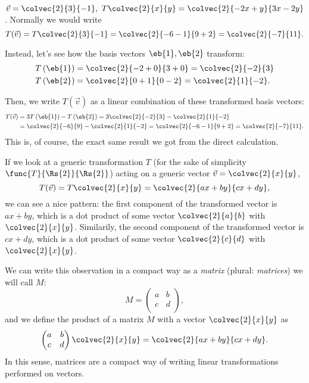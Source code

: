 \begin{example}
  $\vec{v}=\colvec{2}{3}{-1},\ T\colvec{2}{x}{y} = \colvec{2}{-2x+y}{3x-2y}$. Normally we would write
  \begin{equation*}
	T(\vec{v}) = T\colvec{2}{3}{-1} = \colvec{2}{-6-1}{9+2} = \colvec{2}{-7}{11}.
  \end{equation*}

  Instead, let's see how the basis vectors $\eb{1},\eb{2}$ transform:
  \begin{align*}
	T\left(\eb{1}\right) &= \colvec{2}{-2+0}{3+0} = \colvec{2}{-2}{3}\\
	T\left(\eb{2}\right) &= \colvec{2}{0+1}{0-2} = \colvec{2}{1}{-2}.\\
  \end{align*}

  Then, we write $T(\vec{v})$ as a linear combination of these transformed basis vectors:
  \begin{align*}
	T(\vec{v}) &= 3T\left(\eb{1}\right) -T\left( \eb{2} \right) = 3\colvec{2}{-2}{3} -\colvec{2}{1}{-2}\\
	&= \colvec{2}{-6}{9} - \colvec{2}{1}{-2} = \colvec{2}{-6-1}{9+2} = \colvec{2}{-7}{11}.
  \end{align*}
  This is, of course, the exact same result we got from the direct calculation.
\end{example}

If we look at a generic transformation $T$ (for the sake of simplicity $\func{T}{\Rs{2}}{\Rs{2}}$) acting on a generic vector $\vec{v}=\colvec{2}{x}{y}$,
\begin{equation*}
  T(\vec{v}) = T\colvec{2}{x}{y} = \colvec{2}{ax+by}{cx+dy},
\end{equation*}
we can see a nice pattern: the first component of the transformed vector is $ax+by$, which is a dot product of some vector $\colvec{2}{a}{b}$ with $\colvec{2}{x}{y}$. Similarily, the second component of the transformed vector is $cx+dy$, which is a dot product of some vector $\colvec{2}{c}{d}$ with $\colvec{2}{x}{y}$.

We can write this observation in a compact way as a \emph{matrix} (plural: \emph{matrices}) we will call $M$:
\begin{equation*}
  M = \begin{pmatrix} a & b\\ c & d\\\end{pmatrix},
\end{equation*}
and we define the product of a matrix $M$ with a vector $\colvec{2}{x}{y}$ as
\begin{equation*}
  \begin{pmatrix}a&b\\c&d\\\end{pmatrix}\colvec{2}{x}{y} = \colvec{2}{ax+by}{cx+dy}.
\end{equation*}
In this sense, matrices are a compact way of writing linear transformations performed on vectors.

